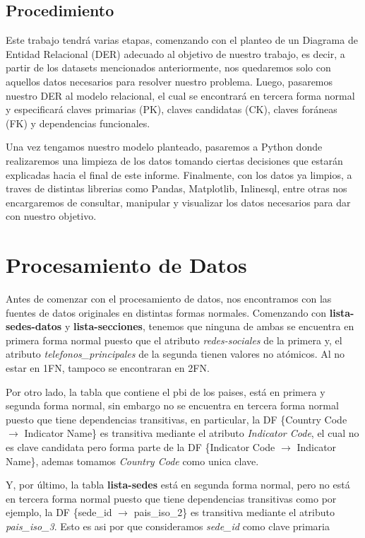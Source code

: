 \documentclass[10pt,a4paper]{article}
\begin{document}
\subsection{Procedimiento} \vspace{0.3cm}

\indent Este trabajo tendrá varias etapas, comenzando con el planteo de un Diagrama de Entidad Relacional (DER) adecuado al objetivo de nuestro trabajo, es decir, a partir de los datasets mencionados anteriormente, nos quedaremos solo con aquellos datos necesarios para resolver nuestro problema. Luego, pasaremos nuestro DER al modelo relacional, el cual se encontrará en tercera forma normal y especificará claves primarias (PK), claves candidatas (CK), claves foráneas (FK) y dependencias funcionales. \par
Una vez tengamos nuestro modelo planteado, pasaremos a Python donde realizaremos una limpieza de los datos tomando ciertas decisiones que estarán explicadas hacia el final de este informe. 
Finalmente, con los datos ya limpios, a traves de distintas librerias como Pandas, Matplotlib, Inlinesql, entre otras nos encargaremos de consultar, manipular y visualizar los datos necesarios para dar con nuestro objetivo.


\newpage

\section{Procesamiento de Datos} \vspace{0.2cm}

Antes de comenzar con el procesamiento de datos, nos encontramos con las fuentes de datos originales en distintas formas normales. Comenzando con \textbf{lista-sedes-datos} y \textbf{lista-secciones}, tenemos que ninguna de ambas se encuentra en primera forma normal puesto que el atributo \textit{redes-sociales} de la primera y, el atributo \textit{telefonos\_principales} de la segunda tienen valores no atómicos. Al no estar en 1FN, tampoco se encontraran en 2FN. \par
Por otro lado, la tabla que contiene el pbi de los paises, está en primera y segunda forma normal, sin embargo no se encuentra en tercera forma normal puesto que tiene dependencias transitivas, en particular, la DF \{Country Code $\rightarrow$ Indicator Name\} es transitiva mediante el atributo \textit{Indicator Code}, el cual no es clave candidata pero forma parte de la DF \{Indicator Code $\rightarrow$ Indicator Name\}, ademas tomamos \textit{Country Code} como unica clave.  \par
Y, por último, la tabla \textbf{lista-sedes} está en segunda forma normal, pero no está en tercera forma normal puesto que tiene dependencias transitivas como por ejemplo, la DF \{sede\_id $\rightarrow$ pais\_iso\_2\} es transitiva mediante el atributo \textit{pais\_iso\_3}. Esto es asi por que consideramos \textit{sede\_id} como clave primaria
\end{document}
